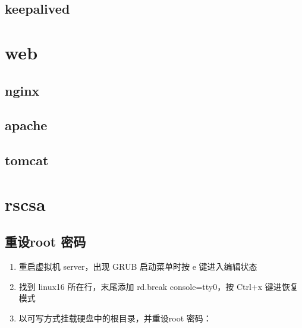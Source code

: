 \documentclass[letterpaper,10pt,english]{sphinxmanual}
\begin{document}
\section{keepalived}
\label{\detokenize{ha_lb/keepalived:keepalived}}\label{\detokenize{ha_lb/keepalived::doc}}

\chapter{web}
\label{\detokenize{web/readme:web}}\label{\detokenize{web/readme::doc}}

\section{nginx}
\label{\detokenize{web/nginx:nginx}}\label{\detokenize{web/nginx::doc}}

\section{apache}
\label{\detokenize{web/apache:apache}}\label{\detokenize{web/apache::doc}}

\section{tomcat}
\label{\detokenize{web/tomcat:tomcat}}\label{\detokenize{web/tomcat::doc}}

\chapter{rscsa}
\label{\detokenize{rhcsa/readme:rscsa}}\label{\detokenize{rhcsa/readme::doc}}

\section{重设root 密码}
\label{\detokenize{rhcsa/rhcsa_7:root}}\label{\detokenize{rhcsa/rhcsa_7::doc}}\begin{enumerate}
\item {} 
重启虚拟机 server，出现 GRUB 启动菜单时按 e 键进入编辑状态

\item {} 
找到 linux16 所在行，末尾添加 rd.break console=tty0，按 Ctrl+x 键进恢复模式

\item {} 
以可写方式挂载硬盘中的根目录，并重设root 密码：

\end{enumerate}
\end{document}
